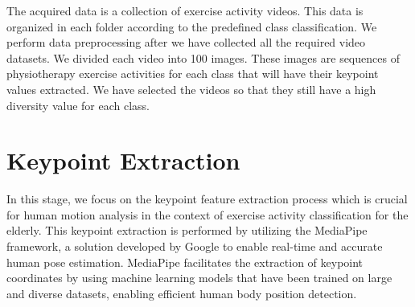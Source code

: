The acquired data is a collection of exercise activity videos. This data is organized in each folder according to the predefined class classification. We perform data preprocessing after we have collected all the required video datasets. We divided each video into 100 images. These images are sequences of physiotherapy exercise activities for each class that will have their keypoint values extracted. We have selected the videos so that they still have a high diversity value for each class.

\section{Keypoint Extraction}
\label{sec:keypoint_extraction}

In this stage, we focus on the keypoint feature extraction process which is crucial for human motion analysis in the context of exercise activity classification for the elderly. This keypoint extraction is performed by utilizing the MediaPipe framework, a solution developed by Google to enable real-time and accurate human pose estimation. MediaPipe facilitates the extraction of keypoint coordinates by using machine learning models that have been trained on large and diverse datasets, enabling efficient human body position detection.

